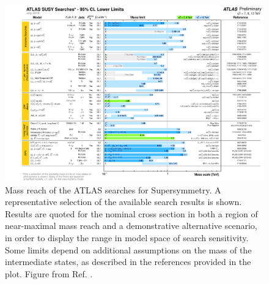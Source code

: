 \begin{figure}[htbp]
	\centering
	\includegraphics[width=1\textwidth]{figures/summary_plots/ATLAS_SUSY_Summary.pdf}
	\caption{	Mass reach of the ATLAS searches for Supersymmetry. 
	A representative selection of the available search results is shown. Results are quoted for the nominal cross section 
	in both a region of near-maximal mass reach and a demonstrative alternative scenario, in order to display the range in 
	model space of search sensitivity. Some limits depend on additional assumptions on the mass of the intermediate states, 
	as described in the references provided in the plot. Figure from Ref. \cite{atlasSUSYSummary}.
	} 
	\label{fig:summary_atlas_summary}
\end{figure}